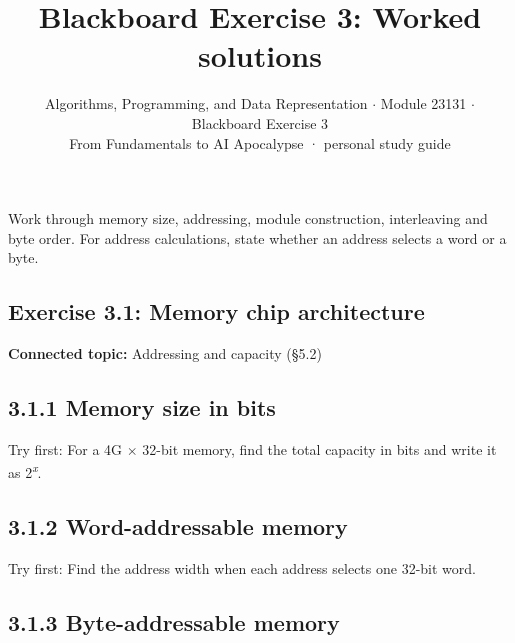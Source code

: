 \documentclass[11pt]{article}
\title{\sffamily\bfseries\color{FAUblue}Blackboard Exercise 3: Worked solutions}
\author{Algorithms, Programming, and Data Representation \ensuremath{\cdot} Module 23131 \ensuremath{\cdot} Blackboard Exercise 3\\[2pt]\small From Fundamentals to AI Apocalypse · personal study guide}
\date{}
\begin{document}
\maketitle
\begingroup\footnotesize\setlength{\parskip}{0pt}\tableofcontents\endgroup
\clearpage

{\large Work through memory size, addressing, module construction, interleaving and byte order. For address calculations, state whether an address selects a word or a byte.}


\begin{keepsection}
\section{Exercise 3.1: Memory chip architecture}

\textbf{Connected topic:} Addressing and capacity (§5.2)

\begin{keepsection}
\subsection{3.1.1 Memory size in bits}

Try first: For a 4G \ensuremath{\times} 32-bit memory, find the total capacity in bits and write it as 2\textsuperscript{\textit{x}}.

\end{keepsection}

\begin{keepsection}
\subsection{3.1.2 Word-addressable memory}

Try first: Find the address width when each address selects one 32-bit word.

\end{keepsection}

\begin{keepsection}
\subsection{3.1.3 Byte-addressable memory}


\end{keepsection}
\end{keepsection}
\end{document}
